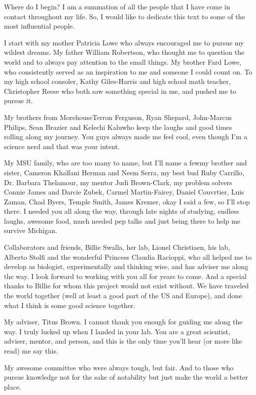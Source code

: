 Where do I begin? I am a summation of all the people that I have come in contact throughout my life. So, I would like to dedicate this text to some of the most influential people. 

I start with my mother Patricia Lowe who always encouraged me to pursue my wildest dreams. My father William Robertson, who thought me to question the world and to always pay attention to the small things. My brother Fard Lowe, who consistently served as an inspiration to me and someone I could count on. To my high school consoler, Kathy Giles-Harris and high school math teacher, Christopher Reese who both saw something special in me, and pushed me to pursue it. 

My brothers from Morehouse\textemdash Terron Ferguson, Ryan Shepard, John-Marcus Philips, Sean Brazier and Kelechi Kalu\textemdash who keep the laughs and good times rolling along my journey. You guys always made me feel cool, even though I'm a science nerd and that was your intent.
  
My MSU family, who are too many to name, but I'll name a few\textemdash my brother and sister, Cameron Khalfani Herman and Neem Serra, my best bud Ruby Carrillo, Dr. Barbara Thelamour, my mentor Judi Brown-Clark, my problem solvers Connie James and Darcie Zubek, Carmel Martin-Fairey, Daniel Couvrtier, Luis Zaman, Chad Byers, Temple Smith, James Kremer, okay I said a few, so I'll stop there. I needed you all along the way, through late nights of studying, endless laughs, awesome food, much needed pep talks and just being there to help me survive Michigan.

Collaborators and friends, Billie Swalla, her lab, Lionel Christiaen, his lab, Alberto Stolfi and the wonderful Princess Claudia Racioppi, who all helped me to develop as biologist, experimentally and thinking wise, and has adviser me along the way. I look forward to working with you all for years to come. And a special thanks to Billie for whom this project would not exist without. We have traveled the world together (well at least a good part of the US and Europe), and done what I think is some good science together.

My adviser, Titus Brown. I cannot thank you enough for guiding me along the way. I truly lucked up when I landed in your lab. You are a great scientist, adviser, mentor, and person, and this is the only time you'll hear (or more like read) me say this.

My awesome committee who were always tough, but fair.
And to those who pursue knowledge not for the sake of notability but just make the world a better place.